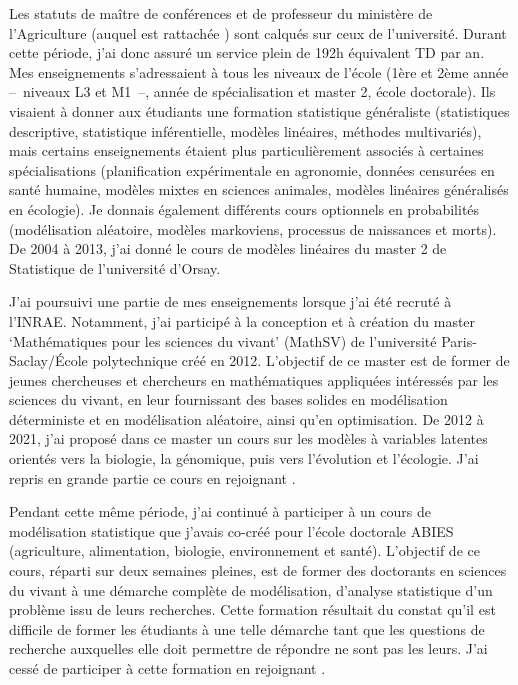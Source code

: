 Les statuts de maître de conférences et de professeur du ministère de l’Agriculture (auquel est rattachée \APT) sont calqués sur ceux de l’université. Durant cette période, j'ai donc assuré un service plein de 192h équivalent TD par an. Mes enseignements s’adressaient à tous les niveaux de l’école (1ère et 2ème année --~niveaux L3 et M1~--, année de spécialisation et master 2, école doctorale). Ils visaient à donner aux étudiants une formation statistique généraliste (statistiques descriptive, statistique inférentielle, modèles linéaires, méthodes multivariés), mais certains enseignements étaient plus particulièrement associés à certaines spécialisations (planification expérimentale en agronomie, données censurées en santé humaine, modèles mixtes en sciences animales, modèles linéaires généralisés en écologie). Je donnais également différents cours optionnels en probabilités (modélisation aléatoire, modèles markoviens, processus de naissances et morts). De 2004 à 2013, j'ai donné le cours de modèles linéaires du master 2 de Statistique de l'université d'Orsay.

\bigskip
J’ai poursuivi une partie de mes enseignements lorsque j’ai été recruté à l’INRAE. Notamment, j'ai participé à la conception et à création du master ‘Mathématiques pour les sciences du vivant’ (MathSV) de l’université Paris-Saclay/École polytechnique créé en 2012. L’objectif de ce master est de former de jeunes chercheuses et chercheurs en mathématiques appliquées intéressés par les sciences du vivant, en leur fournissant des bases solides en modélisation déterministe et en modélisation aléatoire, ainsi qu'en optimisation. De 2012 à 2021, j’ai proposé dans ce master un cours sur les modèles à variables latentes orientés vers la biologie, la génomique, puis vers l’évolution et l’écologie. J’ai repris en grande partie ce cours en rejoignant \SU.

Pendant cette même période, j’ai continué à participer à un cours de modélisation statistique que j’avais co-créé pour l’école doctorale ABIES (agriculture, alimentation, biologie, environnement et santé). L’objectif de ce cours, réparti sur deux semaines pleines, est de former des doctorants en sciences du vivant à une démarche complète de modélisation, d'analyse statistique d’un problème issu de leurs recherches. Cette formation résultait du constat qu’il est difficile de former les étudiants à une telle démarche tant que les questions de recherche auxquelles elle doit permettre de répondre ne sont pas les leurs. J'ai cessé de participer à cette formation en rejoignant \SU.

